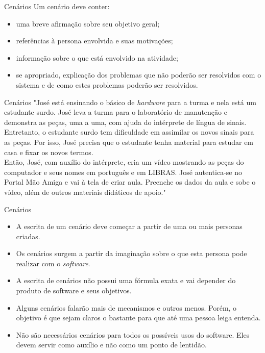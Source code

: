 \documentclass[11pt]{beamer}
\begin{document}
   \begin{frame}{Cenários}
      Um cenário deve conter:
      \begin{itemize}
         \item uma breve afirmação sobre seu objetivo geral;
         \item referências à persona envolvida e suas motivações;
         \item informação sobre o que está envolvido na atividade;
         \item se apropriado, explicação dos problemas que não poderão ser resolvidos com o sistema e de como estes problemas poderão ser resolvidos.
      \end{itemize}
   \end{frame}

   \begin{frame}{Cenários}
      "José está ensinando o básico de \textit{hardware} para a turma e nela está um estudante surdo. José leva a turma para o laboratório de manutenção e demonstra as peças, uma a uma, com ajuda do intérprete de língua de sinais. Entretanto, o estudante surdo tem dificuldade em assimilar os novos sinais para as peças. Por isso, José precisa que o estudante tenha material para estudar em casa e fixar os novos termos.\\
      Então, José, com auxílio do intérprete, cria um vídeo mostrando as peças do computador e seus nomes em português e em LIBRAS. José autentica-se no Portal Mão Amiga e vai à tela de criar aula. Preenche os dados da aula e sobe o vídeo, além de outros materiais didáticos de apoio."
   \end{frame}

   \begin{frame}{Cenários}
      \begin{itemize}
         \item A escrita de um cenário deve começar a partir de uma ou mais personas criadas.
         \item Os cenários surgem a partir da imaginação sobre o que esta persona pode realizar com o \textit{software}.
         \item A escrita de cenários não possui uma fórmula exata e vai depender do produto de software e seus objetivos.
         \item Alguns cenários falarão mais de mecanismos e outros menos. Porém, o objetivo é que sejam claros o bastante para que até uma pessoa leiga entenda.
         \item Não são necessários cenários para todos os possíveis usos do software. Eles devem servir como auxílio e não como um ponto de lentidão.
      \end{itemize}
   \end{frame}
\end{document}
